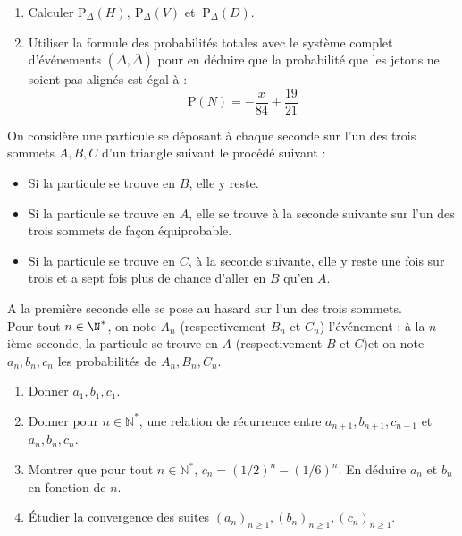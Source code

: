 \documentclass[a4paper,10pt]{report}
\begin{document}
\begin{Exa}
\begin{enumerate}
\begin{enumerate}
\item Calculer $\mathrm{P}_{\Delta
}\left( H\right) ,\ \mathrm{P}_{\Delta}\left( V\right)$ et $\ \mathrm{P}%
_{\Delta}\left( D\right)$.

\item Utiliser la formule des probabilit\'{e}s totales avec le syst\`{e}me
complet d'\'{e}v\'{e}nements $\left( \Delta,\overline{\Delta}\right) $ pour
en d\'{e}duire que la probabilit\'{e} que les jetons ne soient pas align\'{e}s
est \'{e}gal \`{a} $:$%
\begin{equation*}
\mathrm{P}\left( N\right) =-\frac{x}{84}+\frac{19}{21}
\end{equation*}
\end{enumerate}
\end{enumerate}
\end{Exa}




\begin{Exa} On considère une particule se déposant à chaque seconde sur l'un des trois sommets $A,B,C$ d'un triangle suivant le procédé suivant :

\vspace{0.3cm}

\begin{itemize}
 \item Si la particule se trouve en $B$, elle y reste.
 \item Si la particule se trouve en $A$, elle se trouve à la seconde suivante sur l'un des trois sommets de façon équiprobable.
 \item Si la particule se trouve en $C$, à la seconde suivante, elle y reste une fois sur trois et a sept fois plus de chance d'aller en $B$ qu'en $A$.
\end{itemize}

\vspace{0.3cm}

\noindent A la première seconde elle se pose au hasard sur l'un des trois sommets.\\
Pour tout $n\in \N^*$, on note $A_n$ (respectivement $B_n$ et $C_n$) l'événement : \og à la $n$-ième seconde, la particule se trouve en $A$ (respectivement $B$ et $C$)\fg et on note $a_n, b_n, c_n$ les probabilités de $A_n, B_n, C_n$.

\vspace{0.3cm}

\begin{enumerate}
 \item Donner $a_1, b_1, c_1$.
 \item Donner pour $n \in \mathbb{N}^*$, une relation de récurrence entre $a_{n+1}, b_{n+1}, c_{n+1}$ et $a_n, b_n, c_n$.
 \item Montrer que pour tout $n \in \mathbb{N}^*$, $c_n = (1/2)^n-(1/6)^n$. En déduire $a_n$ et $b_n$ en fonction de $n$.
 \item Étudier la convergence des suites $(a_n)_{n \geq 1}, (b_n)_{n \geq 1}, (c_n)_{n \geq 1}$.
\end{enumerate}
\end{Exa}
\end{document}
